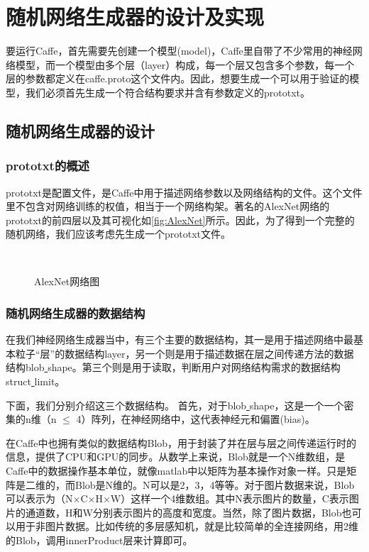 ﻿\chapter{随机网络生成器的设计及实现}
要运行Caffe，首先需要先创建一个模型(model)，Caffe里自带了不少常用的神经网络模型，而一个模型由多个层（layer）构成，每一个层又包含多个参数，每一个层的参数都定义在caffe.proto这个文件内。因此，想要生成一个可以用于验证的模型，我们必须首先生成一个符合结构要求并含有参数定义的prototxt。
\section{随机网络生成器的设计}
\subsection{prototxt的概述}
prototxt是配置文件，是Caffe中用于描述网络参数以及网络结构的文件。这个文件里不包含对网络训练的权值，相当于一个网络构架。著名的AlexNet网络的prototxt的前四层以及其可视化如\autoref{fig:AlexNet}所示。因此，为了得到一个完整的随机网络，我们应该考虑先生成一个prototxt文件。

\begin{figure}[!htbp]
\centering 
{}
\\
\caption{AlexNet网络图}
\label{fig:AlexNet}
\end{figure}

\subsection{随机网络生成器的数据结构}
在我们神经网络生成器当中，有三个主要的数据结构，其一是用于描述网络中最基本粒子“层”的数据结构layer，另一个则是用于描述数据在层之间传递方法的数据结构blob\underline{ }shape。第三个则是用于读取，判断用户对网络结构需求的数据结构struct\underline{ }limit。

下面，我们分别介绍这三个数据结构。
首先，对于blob\underline{ }shape，这是一个一个密集的n维（n $\leq$ 4）阵列，在神经网络中，这代表神经元和偏置(bias)。

在Caffe中也拥有类似的数据结构Blob，用于封装了并在层与层之间传递运行时的信息，提供了CPU和GPU的同步。从数学上来说，Blob就是一个N维数组，是Caffe中的数据操作基本单位，就像matlab中以矩阵为基本操作对象一样。只是矩阵是二维的，而Blob是N维的。N可以是2，3，4等等。对于图片数据来说，Blob可以表示为（N$\times$C$\times$H$\times$W）这样一个4维数组。其中N表示图片的数量，C表示图片的通道数，H和W分别表示图片的高度和宽度。当然，除了图片数据，Blob也可以用于非图片数据。比如传统的多层感知机，就是比较简单的全连接网络，用2维的Blob，调用innerProduct层来计算即可。

